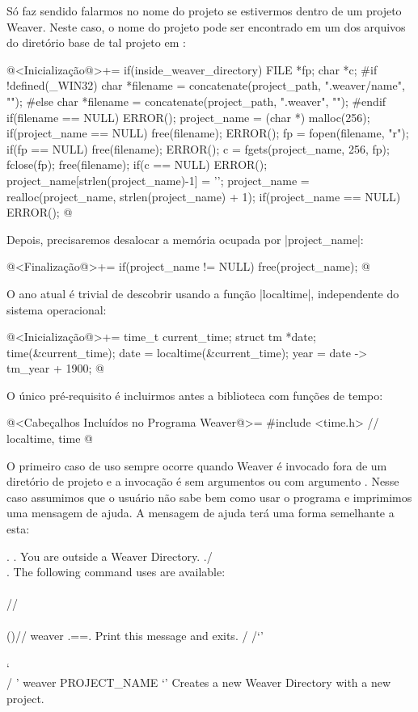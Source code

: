 {Só faz sendido falarmos no nome do projeto se estivermos dentro de um
projeto Weaver. Neste caso, o nome do projeto pode ser encontrado em
um dos arquivos do diretório base de tal projeto em
:

\iniciocodigo
@<Inicialização@>+=
if(inside_weaver_directory){
  FILE *fp;
  char *c;
#if !defined(_WIN32)
  char *filename = concatenate(project_path, ".weaver/name", "");
#else
  char *filename = concatenate(project_path, ".weaver\name", "");
#endif
  if(filename == NULL) ERROR();
  project_name = (char *) malloc(256);
  if(project_name == NULL){
    free(filename);
    ERROR();
  }
  fp = fopen(filename, "r");
  if(fp == NULL){
    free(filename);
    ERROR();
  }
  c = fgets(project_name, 256, fp);
  fclose(fp);
  free(filename);
  if(c == NULL) ERROR();
  project_name[strlen(project_name)-1] = '\0';
  project_name = realloc(project_name, strlen(project_name) + 1);
  if(project_name == NULL) ERROR();
}
@
\fimcodigo

Depois, precisaremos desalocar a memória ocupada por |project_name|:

\iniciocodigo
@<Finalização@>+=
if(project_name != NULL) free(project_name);
@
\fimcodigo


O ano atual é trivial de descobrir usando a função |localtime|,
independente do sistema operacional:

\iniciocodigo
@<Inicialização@>+=
{
  time_t current_time;
  struct tm *date;
  time(&current_time);
  date = localtime(&current_time);
  year = date -> tm_year + 1900;
}
@
\fimcodigo

O único pré-requisito é incluirmos antes a biblioteca com funções de
tempo:

\iniciocodigo
@<Cabeçalhos Incluídos no Programa Weaver@>=
#include <time.h> // localtime, time
@
\fimcodigo



O primeiro caso de uso sempre ocorre quando Weaver é invocado fora de
um diretório de projeto e a invocação é sem argumentos ou com
argumento . Nesse caso assumimos que o usuário não sabe
bem como usar o programa e imprimimos uma mensagem de ajuda. A mensagem
de ajuda terá uma forma semelhante a esta:

\alinhaverbatim
    .  .   You are outside a Weaver Directory.
   ./  \\.  The following command uses are available:
   \\\\  //
   \\\\()//  weaver
   .={}=.      Print this message and exits.
  / /`'\\ \\
  ` \\  / '  weaver PROJECT_NAME
     `'        Creates a new Weaver Directory with a new
               project.
\alinhanormal

}
